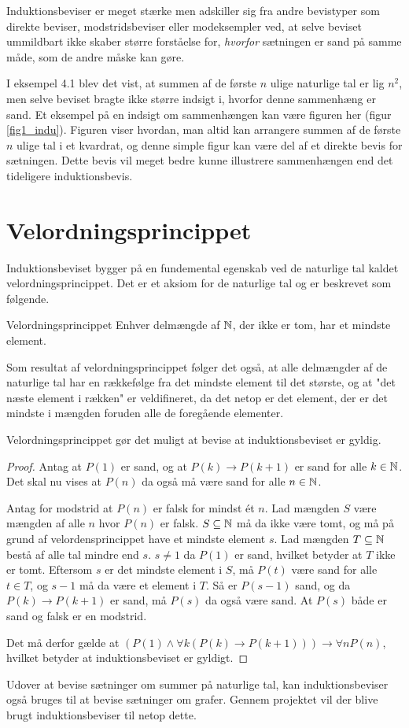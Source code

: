 Induktionsbeviser er meget stærke men adskiller sig fra andre bevistyper som direkte beviser, modstridsbeviser eller modeksempler ved, at selve beviset ummildbart ikke skaber større forståelse for, \textit{hvorfor} sætningen er sand på samme måde, som de andre måske kan gøre.

I eksempel 4.1 blev det vist, at summen af de første $n$ ulige naturlige tal er lig $n^2$, men selve beviset bragte ikke større indsigt i, hvorfor denne sammenhæng er sand.
Et eksempel på en indsigt om sammenhængen kan være figuren her (figur \ref{fig1_indu}).
Figuren viser hvordan, man altid kan arrangere summen af de første $n$ ulige tal i et kvardrat, og denne simple figur kan være del af et direkte bevis for sætningen.
Dette bevis vil meget bedre kunne illustrere sammenhængen end det tideligere induktionsbevis.

\section{Velordningsprincippet}
Induktionsbeviset bygger på en fundemental egenskab ved de naturlige tal kaldet velordningsprincippet.
Det er et aksiom for de naturlige tal og er beskrevet som følgende.
\begin{theorembox}{Velordningsprincippet}
	Enhver delmængde af $\mathbb{N}$, der ikke er tom, har et mindste element.
\end{theorembox}
\noindent Som resultat af velordningsprincippet følger det også, at alle delmængder af de naturlige tal har en rækkefølge fra det mindste element til det største, og at "det næste element i rækken" er veldifineret, da det netop er det element, der er det mindste i mængden foruden alle de foregående elementer.

Velordningsprincippet gør det muligt at bevise at induktionsbeviset er gyldig.
\begin{proof}
	Antag at $P(1)$ er sand, og at $P(k) \to P(k + 1)$ er sand for alle $k \in \mathbb{N}$.
	Det skal nu vises at $P(n)$ da også må være sand for alle $n \in \mathbb{N}$.

	Antag for modstrid at $P(n)$ er falsk for mindst ét $n$.
	Lad mængden $S$ være mængden af alle $n$ hvor $P(n)$ er falsk.
	$S \subseteq \mathbb{N}$ må da ikke være tomt, og må på grund af velordensprincippet have et mindste element $s$.
	Lad mængden $T \subseteq \mathbb{N}$ bestå af alle tal mindre end $s$. $s \neq 1$ da $P(1)$ er sand, hvilket betyder at $T$ ikke er tomt.
	Eftersom $s$ er det mindste element i $S$, må $P(t)$ være sand for alle $t \in T$, og $s - 1$ må da være et element i $T$.
	Så er $P(s-1)$ sand, og da $P(k) \to P(k+1)$ er sand, må $P(s)$ da også være sand.
	At $P(s)$ både er sand og falsk er en modstrid.

	Det må derfor gælde at $(P(1) \land \forall k ( P(k) \to P(k + 1))) \to \forall n P(n)$, hvilket betyder at induktionsbeviset er gyldigt.
\end{proof}
Udover at bevise sætninger om summer på naturlige tal, kan induktionsbeviser også bruges til at bevise sætninger om grafer.
Gennem projektet vil der blive brugt induktionsbeviser til netop dette.
